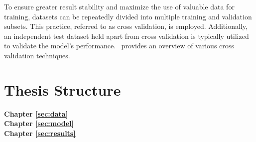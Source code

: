 To ensure greater result stability and maximize the use of valuable data for training, datasets can be repeatedly divided into multiple training and validation subsets. This practice, referred to as cross validation, is employed. Additionally, an independent test dataset held apart from cross validation is typically utilized to validate the model's performance.~\cite{browne2000cv} provides an overview of various cross validation techniques.

\section{Thesis Structure}
\label{sec:intro:structure}

\textbf{Chapter \ref{sec:data}} \\[0.2em]


\textbf{Chapter \ref{sec:model}} \\[0.2em]


\textbf{Chapter \ref{sec:results}} \\[0.2em]

